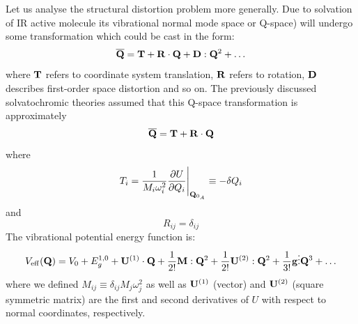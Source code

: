 \documentclass[b5paper,oneside,fleqn,11pt]{book}
\newcommand{\fderiv}[2]{\ensuremath{
    \frac{\partial #1}{\partial #2}}}
\begin{document}
\begin{refsection}
Let us analyse the structural distortion problem more generally.
Due to solvation of IR active molecule its vibrational normal mode space 
or Q-space) will
undergo some transformation which could be cast in the form:
%
\begin{equation}  \label{e:Q-space-transform}
{\bf \overline{Q}} = {\bf T} + {\bf R} \cdot {\bf Q} + {\bf D} : {\bf Q}^2 + \ldots
\end{equation}
%
where ${\bf T}$ refers to coordinate system translation, ${\bf R}$ refers to rotation,
${\bf D}$ describes first\hyp{}order space distortion and so on. The previously
discussed solvatochromic theories assumed that this Q-space transformation is approximately
%
\begin{equation}\label{e:Q-space-transform-theory-0}
{\bf \overline{Q}} = {\bf T} + {\bf R} \cdot {\bf Q}
\end{equation}
%
where 
%
\begin{equation}\label{e:T-th-0}
T_i = \frac{1}{M_i\omega_i^2}\fderiv{U}{Q_i}  \Bigg|_{{\bf Q}_{0_A}}       
 \equiv -\delta Q_i
\end{equation}
and
\begin{equation}\label{e:R-th-0}
R_{ij} = \delta_{ij}
\end{equation}
%
The vibrational potential energy function is:
%
\begin{equation}\label{e:V}
V_{\rm eff} ({\bf Q})
= V_0 + E^{\rm 1,0}_g + {\bf U}^{(1)} \cdot {\bf Q} + \frac{1}{2!} {\bf M} : {\bf Q}^2 + 
\frac{1}{2!} {\bf U}^{(2)} : {\bf Q}^2 + \frac{1}{3!} {\bf g} \vdots {\bf Q}^3 + \ldots
\end{equation}
%
where we defined $M_{ij} \equiv \delta_{ij}M_j\omega_j^2$
as well as ${\bf U}^{(1)}$ (vector) and ${\bf U}^{(2)}$ (square symmetric matrix) 
are the first and second derivatives
of $U$ with respect to normal coordinates, respectively.


\end{refsection}
\end{document}
